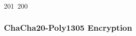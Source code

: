 201~200~\documentclass{article}
\begin{document}
	                                                                                                                                                                                                                                                                                                	                                                                                                                                        	    	                                                                                                	                                                                                                                                                                                                                                                                                                                                	                                                                        	                                                                        	                                                                                                                                        	                                                                                                                                                                                                                        	                                                                                                                            	                                                                	                                                                                        \subsubsection{ChaCha20-Poly1305 Encryption}
\end{document}
